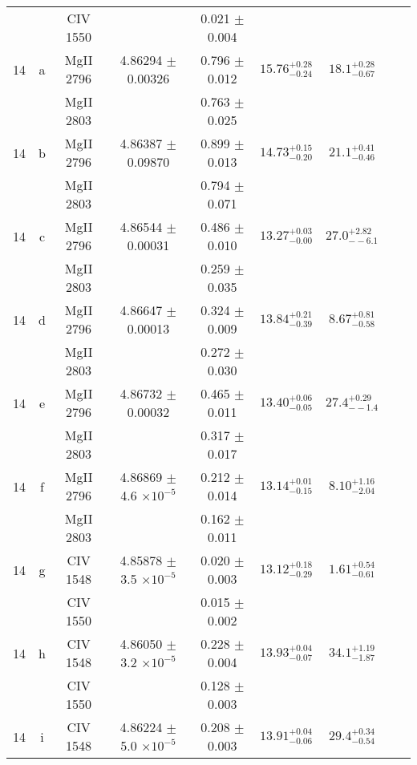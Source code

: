 \documentclass[12pt]{article}
\begin{document}
\begin{footnotesize}
\begin{longtable}{ c c c c c c c c c}
  &   & CIV     1550  &  &  0.021 $\pm$ 0.004   &   &     & 	 & \\ 
      14  & a  & MgII     2796  &  4.86294 $\pm$ 0.00326  &  0.796 $\pm$ 0.012   & $15.76_{ - 0.24}^{ + 0.28}$  & $18.1_{ - 0.67}^{ + 0.28}$    & 	 & \\ 
  &   & MgII     2803  &  &  0.763 $\pm$ 0.025   &   &     & 	 & \\ 
      14  & b  & MgII     2796  &  4.86387 $\pm$ 0.09870  &  0.899 $\pm$ 0.013   & $14.73_{ - 0.20}^{ + 0.15}$  & $21.1_{ - 0.46}^{ + 0.41}$    & 	 & \\ 
  &   & MgII     2803  &  &  0.794 $\pm$ 0.071   &   &     & 	 & \\ 
      14  & c  & MgII     2796  &  4.86544 $\pm$ 0.00031  &  0.486 $\pm$ 0.010   & $13.27_{ - 0.00}^{ + 0.03}$  & $27.0_{ - -6.1}^{ + 2.82}$    & 	 & \\ 
  &   & MgII     2803  &  &  0.259 $\pm$ 0.035   &   &     & 	 & \\ 
      14  & d  & MgII     2796  &  4.86647 $\pm$ 0.00013  &  0.324 $\pm$ 0.009   & $13.84_{ - 0.39}^{ + 0.21}$  & $8.67_{ - 0.58}^{ + 0.81}$    & 	 & \\ 
  &   & MgII     2803  &  &  0.272 $\pm$ 0.030   &   &     & 	 & \\ 
      14  & e  & MgII     2796  &  4.86732 $\pm$ 0.00032  &  0.465 $\pm$ 0.011   & $13.40_{ - 0.05}^{ + 0.06}$  & $27.4_{ - -1.4}^{ + 0.29}$    & 	 & \\ 
  &   & MgII     2803  &  &  0.317 $\pm$ 0.017   &   &     & 	 & \\ 
      14  & f  & MgII     2796  &  4.86869 $\pm$ 4.6 $\times 10^{-5}$   &  0.212 $\pm$ 0.014   & $13.14_{ - 0.15}^{ + 0.01}$  & $8.10_{ - 2.04}^{ + 1.16}$    & 	 & \\ 
  &   & MgII     2803  &  &  0.162 $\pm$ 0.011   &   &     & 	 & \\ 
      14  & g  & CIV     1548  &  4.85878 $\pm$ 3.5 $\times 10^{-5}$   &  0.020 $\pm$ 0.003   & $13.12_{ - 0.29}^{ + 0.18}$  & $1.61_{ - 0.61}^{ + 0.54}$    & 	 & \\ 
  &   & CIV     1550  &  &  0.015 $\pm$ 0.002   &   &     & 	 & \\ 
      14  & h  & CIV     1548  &  4.86050 $\pm$ 3.2 $\times 10^{-5}$   &  0.228 $\pm$ 0.004   & $13.93_{ - 0.07}^{ + 0.04}$  & $34.1_{ - 1.87}^{ + 1.19}$    & 	 & \\ 
  &   & CIV     1550  &  &  0.128 $\pm$ 0.003   &   &     & 	 & \\ 
      14  & i  & CIV     1548  &  4.86224 $\pm$ 5.0 $\times 10^{-5}$   &  0.208 $\pm$ 0.003   & $13.91_{ - 0.06}^{ + 0.04}$  & $29.4_{ - 0.54}^{ + 0.34}$    & 	 & \\ 

\end{longtable}
\end{footnotesize}
\end{document}
